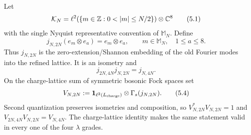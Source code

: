Let
\[
 \mathcal K_N
 =\ell^2\!\left(\{m\in\Z:0<|m|\le N/2\}\right)\otimes\C^8
\tag{5.1}\label{eq:oneparticleboson}
\]
with the single Nyquist representative convention of
$\mathbb M_N$.  Define
\[
 j_{N,2N}(e_m\otimes e_a)=e_m\otimes e_a,
\qquad m\in\mathbb M_N,\quad 1\le a\le8.
\tag{5.2}\label{eq:modeisometry}
\]
Thus $j_{N,2N}$ is the zero-extension/Shannon embedding of the old
Fourier modes into the refined lattice.  It is an isometry and
\[
 j_{2N,4N}j_{N,2N}=j_{N,4N}.
\tag{5.3}\label{eq:modecompat}
\]
On the charge-lattice sum of symmetric bosonic Fock spaces set
\[
 V_{N,2N}
 :=\mathbf 1_{\ell^2(L_{\rm charge})}\otimes\Gamma_s(j_{N,2N}).
\tag{5.4}\label{eq:Fockisometry}
\]
Second quantization preserves isometries and composition, so
$V_{N,2N}^*V_{N,2N}=1$ and
$V_{2N,4N}V_{N,2N}=V_{N,4N}$.  The charge-lattice identity makes the
same statement valid in every one of the four $\lambda$ grades.

